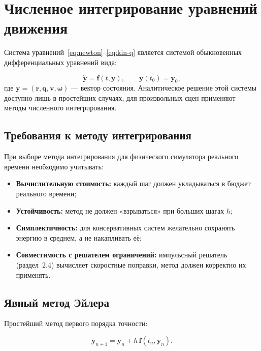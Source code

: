 \section{Численное интегрирование уравнений движения}

Система уравнений~\eqref{eq:newton}–\eqref{eq:kin-q} является системой обыкновенных дифференциальных уравнений 
вида:

\begin{equation}
  \dot{\mathbf{y}} = \mathbf{f}(t, \mathbf{y}), \qquad \mathbf{y}(t_0) = \mathbf{y}_0,
  \label{eq:ode}
\end{equation} где $\mathbf{y} = (\mathbf{r}, \mathbf{q}, \mathbf{v}, \boldsymbol{\omega})$ --- вектор 
состояния. Аналитическое решение этой системы доступно лишь в простейших случаях, для произвольных сцен 
применяют методы численного интегрирования.

\subsection{Требования к методу интегрирования}

При выборе метода интегрирования для физического симулятора реального времени необходимо учитывать:

\begin{itemize}
  \item \textbf{Вычислительную стоимость:} каждый шаг должен укладываться в бюджет реального времени;
  \item \textbf{Устойчивость:} метод не должен «взрываться» при больших шагах $h$;
  \item \textbf{Симплектичность:} для консервативных систем желательно сохранять энергию в среднем, а не 
        накапливать её;
  \item \textbf{Совместимость с решателем ограничений:} импульсный решатель (раздел~2.4) вычисляет скоростные 
        поправки, метод должен корректно их применять.
\end{itemize}

\subsection{Явный метод Эйлера}

Простейший метод первого порядка точности:

\begin{equation}
  \mathbf{y}_{n+1} = \mathbf{y}_n + h\,\mathbf{f}(t_n, \mathbf{y}_n).
  \label{eq:explicit-euler}
\end{equation}

